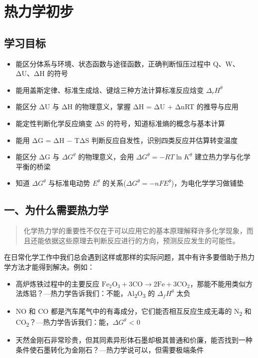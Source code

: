 \section{热力学初步}\label{ux70edux529bux5b66ux521dux6b65}

\subsection{学习目标}\label{ux5b66ux4e60ux76eeux6807}

\begin{itemize}
\tightlist
\item
  能区分体系与环境、状态函数与途径函数，正确判断恒压过程中 Q、W、ΔU、ΔH 的符号
\item
  能用盖斯定律、标准生成焓、键焓三种方法计算标准反应焓变 \(\Delta_r H^\theta\)
\item
  能区分 ΔU 与 ΔH 的物理意义，掌握 ΔH = ΔU + ΔnRT 的推导与应用
\item
  能定性判断化学反应熵变 ΔS 的符号，知道标准熵的概念与基本计算
\item
  能用 ΔG = ΔH − TΔS 判断反应自发性，识别四类反应并估算转变温度
\item
  能区分 ΔG 与 \(\Delta G^\theta\) 的物理意义，会用 \(\Delta G^\theta = -RT \ln K^\theta\) 建立热力学与化学平衡的桥梁
\item
  知道 \(\Delta G^\theta\) 与标准电动势 \(E^\theta\) 的关系(\(\Delta G^\theta = -nFE^\theta\))，为电化学学习做铺垫
\end{itemize}

\subsection{一、为什么需要热力学}\label{ux4e00ux4e3aux4ec0ux4e48ux9700ux8981ux70edux529bux5b66}

\begin{quote}
化学热力学的重要性不仅在于可以应用它的基本原理解释许多化学现象，而且还能依据这些原理去判断反应进行的方向，预测反应发生的可能性。
\end{quote}

在日常化学工作中我们总会遇到这样或那样的实际问题，其中有许多要借助于热力学方法才能得到解决。例如：

\begin{itemize}
\tightlist
\item
  高炉炼铁过程中的主要反应 \(\mathrm{Fe_2O_3 + 3CO \to 2Fe + 3CO_2}\)，那能不能用类似方法炼铝？---热力学告诉我们：不能，Al\textsubscript{2}O\textsubscript{3} 的 \(\Delta_f H^\theta\) 太负
\item
  NO 和 CO 都是汽车尾气中的有毒成分，它们能否相互反应生成无毒的 N\textsubscript{2} 和 CO\textsubscript{2}？---热力学告诉我们：能，\(\Delta G^\theta\) \textless{} 0
\item
  天然金刚石非常珍贵，但其同素异形体石墨却极其普通和价廉，能否找到一种条件使石墨转化为金刚石？---热力学说可以，但需要极端条件
\end{itemize}

